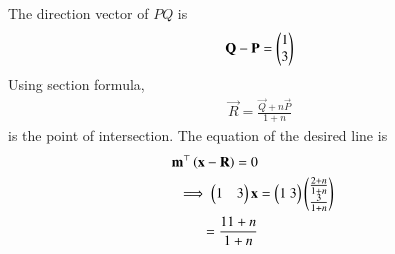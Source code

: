 The direction vector of 
$PQ$ is 
\begin{align}
     \mathbf{Q
 }-  \mathbf{P
 }
=
     \begin{pmatrix}
  1\\
  3
 \end{pmatrix}
\end{align}
 Using section formula, 
 \begin{align}
	 \vec{R}=\frac{\vec{Q}+n\vec{P}}{1+n}
\end{align}
is the point of intersection.
The 
equation of the desired line  is
\begin{align}
	\mathbf{m}^{\top}\left(\mathbf{x}-\mathbf{R}\right)=0
\\
\implies 
	   \begin{pmatrix}
		   1 &  3\end{pmatrix}\mathbf{x}
	   &= \begin{pmatrix}
  1\ 3\end{pmatrix}\begin{pmatrix}
  \frac{2+n}{1+n}\\
  \frac{3}{1+n}\end{pmatrix} 
  \\
	=	  \frac{11+n}{1+n} 
\end{align}

